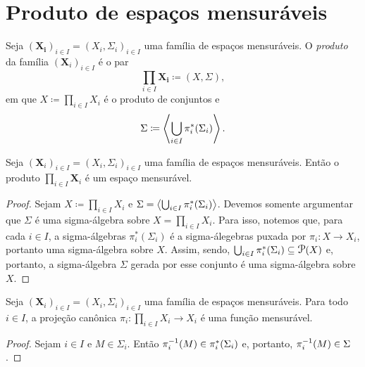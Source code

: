 \clearpage
\section{Produto de espaços mensuráveis}

\begin{defi}
Seja $(\bm{X_i})_{i \in I} = (X_i,\Sigma_i)_{i \in I}$ uma família de espaços mensuráveis. O \emph{produto} da família $(\bm X_i)_{i \in I}$ é o par
	\begin{equation*}
	\prod_{i \in I} \bm{X_i} \coloneqq (X,\Sigma),
	\end{equation*}
em que $X \coloneqq \prod_{i \in I} X_i$ é o produto de conjuntos e
	\begin{equation*}
	\Sigma \coloneqq \left\langle \bigcup_{i \in I} \pi_i^*(\Sigma_i) \right\rangle.
	\end{equation*}
\end{defi}

\begin{prop}
Seja $(\bm X_i)_{i \in I} = (X_i,\Sigma_i)_{i \in I}$ uma família de espaços mensuráveis. Então o produto $\prod_{i \in I} \bm X_i$ é um espaço mensurável.
\end{prop}
\begin{proof}
Sejam $X \coloneqq \prod_{i \in I} X_i$ e $\Sigma=\left\langle \bigcup_{i \in I} \pi_i^*(\Sigma_i) \right\rangle$. Devemos somente argumentar que $\Sigma$ é uma sigma-álgebra sobre $X= \prod_{i \in I} X_i$. Para isso, notemos que, para cada $i \in I$, a sigma-álgebras $\pi_i^*(\Sigma_i)$ é a sigma-álegebras puxada por $\pi_i: X \to X_i$, portanto uma sigma-álgebra sobre $X$. Assim, sendo, $\bigcup_{i \in I} \pi_i^*(\Sigma_i) \subseteq \p(X)$ e, portanto, a sigma-álgebra $\Sigma$ gerada por esse conjunto é uma sigma-álgebra sobre $X$.
\end{proof}

\begin{prop}
Seja $(\bm X_i)_{i \in I} = (X_i,\Sigma_i)_{i \in I}$ uma família de espaços mensuráveis. Para todo $i \in I$, a projeção canônica $\pi_i: \prod_{i \in I} X_i \to X_i$ é uma função mensurável.
\end{prop}
\begin{proof}
Sejam $i \in I$ e $M \in \Sigma_i$. Então $\pi_i^{-1}(M) \in \pi_i^*(\Sigma_i)$ e, portanto, $\pi_i^{-1}(M) \in \Sigma$.
\end{proof}

